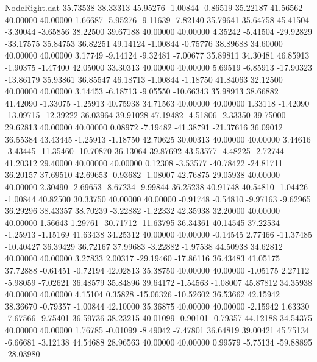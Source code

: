 \begin{filecontents}{NodeRight.dat}
  35.73538   38.33313   45.95276    -1.00844   -0.86519   35.22187   41.56562   40.00000   40.00000    1.66687   -5.95276   -9.11639   -7.82140
  35.79641   35.64758   45.41504    -3.30044   -3.65856   38.22500   39.67188   40.00000   40.00000    4.35242   -5.41504  -29.92829  -33.17575
  35.84753   36.82251   49.14124    -1.00844   -0.75776   38.89688   34.60000   40.00000   40.00000    3.17749   -9.14124   -9.32481   -7.00677
  35.89811   34.30481   46.85913    -1.90375   -1.47400   42.05000   33.30313   40.00000   40.00000    5.69519   -6.85913  -17.90323  -13.86179
  35.93861   36.85547   46.18713    -1.00844   -1.18750   41.84063   32.12500   40.00000   40.00000    3.14453   -6.18713   -9.05550  -10.66343
  35.98913   38.66882   41.42090    -1.33075   -1.25913   40.75938   34.71563   40.00000   40.00000    1.33118   -1.42090  -13.09715  -12.39222
  36.03964   39.91028   47.19482    -4.51806   -2.33350   39.75000   29.62813   40.00000   40.00000    0.08972   -7.19482  -41.38791  -21.37616
  36.09012   36.55384   43.43445    -1.25913   -1.18750   42.70625   30.00313   40.00000   40.00000    3.44616   -3.43445  -11.35460  -10.70870
  36.13064   39.87692   43.53577    -4.48225   -2.72744   41.20312   29.40000   40.00000   40.00000    0.12308   -3.53577  -40.78422  -24.81711
  36.20157   37.69510   42.69653    -0.93682   -1.08007   42.76875   29.05938   40.00000   40.00000    2.30490   -2.69653   -8.67234   -9.99844
  36.25238   40.91748   40.54810    -1.04426   -1.00844   40.82500   30.33750   40.00000   40.00000   -0.91748   -0.54810   -9.97163   -9.62965
  36.29296   38.43357   38.70239    -3.22882   -1.22332   42.35938   32.20000   40.00000   40.00000    1.56643    1.29761  -30.71712  -11.63795
  36.34361   40.14545   37.22534    -1.25913   -1.15169   41.63438   34.25312   40.00000   40.00000   -0.14545    2.77466  -11.37485  -10.40427
  36.39429   36.72167   37.99683    -3.22882   -1.97538   44.50938   34.62812   40.00000   40.00000    3.27833    2.00317  -29.19460  -17.86116
  36.43483   41.05175   37.72888    -0.61451   -0.72194   42.02813   35.38750   40.00000   40.00000   -1.05175    2.27112   -5.98059   -7.02621
  36.48579   35.84896   39.64172    -1.54563   -1.08007   45.87812   34.35938   40.00000   40.00000    4.15104    0.35828  -15.06326  -10.52602
  36.53662   42.15942   38.36670    -0.79357   -1.00844   42.10000   35.36875   40.00000   40.00000   -2.15942    1.63330   -7.67566   -9.75401
  36.59736   38.23215   40.01099    -0.90101   -0.79357   44.12188   34.54375   40.00000   40.00000    1.76785   -0.01099   -8.49042   -7.47801
  36.64819   39.00421   45.75134    -6.66681   -3.12138   44.54688   28.96563   40.00000   40.00000    0.99579   -5.75134  -59.88895  -28.03980

\end{filecontents}
